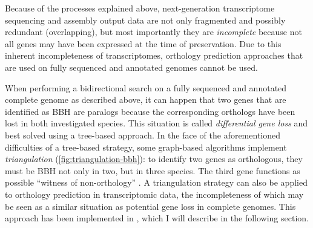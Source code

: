 Because of the processes explained above, next-generation transcriptome
sequencing and assembly output data are not only fragmented and possibly
redundant (overlapping), but most importantly they are \emph{incomplete} because
not all genes may have been expressed at the time of preservation. Due to this
inherent incompleteness of transcriptomes, orthology prediction approaches that
are used on fully sequenced and annotated genomes cannot be used.



When performing a bidirectional search on a fully sequenced and annotated
complete genome as described above, it can happen that two genes that are
identified as BBH are paralogs because the corresponding orthologs have been
lost in both investigated species. This situation is called \emph{differential
gene loss} and best solved using a tree-based approach. In the face of the
aforementioned difficulties of a tree-based strategy, some graph-based
algorithms implement \emph{triangulation} (\autoref{fig:triangulation-bbh}): to
identify two genes as orthologous, they must be BBH not only in two, but in
three species. The third gene functions as possible ``witness of non-orthology''
\citep{dessimoz2006}. A triangulation strategy can also be applied to orthology
prediction in transcriptomic data, the incompleteness of which may be seen as a
similar situation as potential gene loss in complete genomes. This approach has
been implemented in \hamstr \citep{ebersberger2009}, which I will describe in
the following section.
